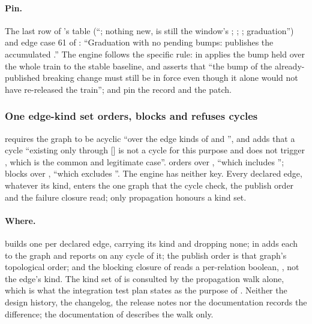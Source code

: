 \paragraph{Pin.} The last row of 's table (``;
nothing new,  is still the window's ; ;
; graduation'') and edge case 61 of : ``Graduation
with no pending bumps: publishes the accumulated .'' The engine
follows the specific rule:  in  applies
the bump held over the whole train to the stable baseline, and
 asserts that ``the bump of the
already-published breaking change must still be in force even though it
alone would not have re-released the train'';
 and
 pin the record and the
patch.

\subsubsection{One edge-kind set orders, blocks and refuses cycles}

\begin{obligation}
\label{ob:kinds}
 requires the graph to be acyclic ``over the edge kinds of
 and '', and adds that a
cycle ``existing only through [] is not a cycle for
this purpose and does not trigger , which is the common and
legitimate case''.  orders over ,
``which includes '';  blocks over
, ``which excludes ''.
The engine has neither key. Every declared edge, whatever its kind, enters
the one graph that the cycle check, the publish order and the failure
closure read; only propagation honours a kind set.
\end{obligation}

\paragraph{Where.}  builds one  per
declared edge, carrying its kind and dropping none;  in
 adds each to the graph and reports  on any cycle
of it; the publish order is that graph's topological order; and the blocking
closure of  reads a per-relation boolean,
, not the edge's kind. The kind set of
 is consulted by the propagation walk alone,
which is what the integration test plan states as the purpose of
. Neither the design
history, the changelog, the release notes nor the documentation records the
difference; the documentation of  describes the walk
only.

